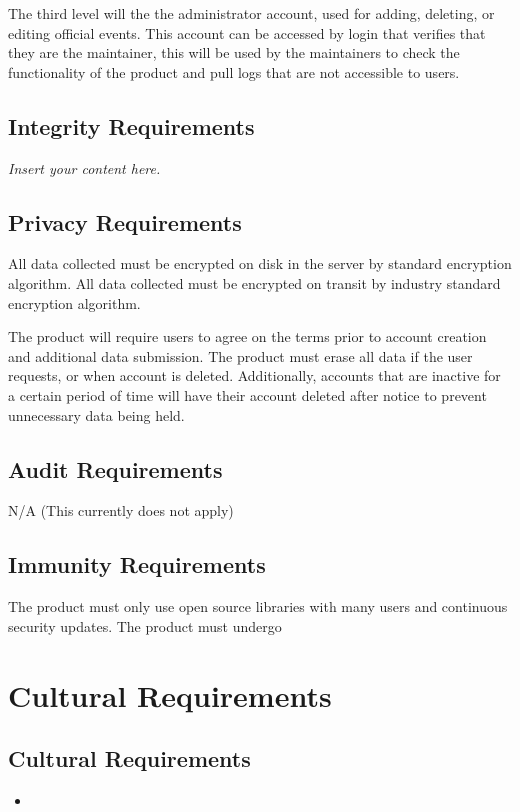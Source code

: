 \documentclass[12pt]{article}
\newcommand{\lips}{\textit{Insert your content here.}}
\begin{document}
The third level will the the administrator account, used for adding, deleting, or editing official events. This account can be accessed by login that verifies that they are the maintainer, this will be used by the maintainers to check the functionality of the product  and pull logs that are not accessible to users.

\subsection{Integrity Requirements}
\lips
\subsection{Privacy Requirements}

All data collected must be encrypted on disk in the server by standard encryption algorithm.
All data collected must be encrypted on transit by industry standard encryption algorithm.

The product will require users to agree on the terms prior to account creation and additional data submission.
The product must erase all data if the user requests, or when account is deleted.
Additionally, accounts that are inactive for a certain period of time will have their account deleted after notice to prevent unnecessary data being held.

\subsection{Audit Requirements}

N/A (This currently does not apply)

\subsection{Immunity Requirements}

The product must only use open source libraries with many users and continuous security updates. 
The product must undergo  

\section{Cultural Requirements}
\subsection{Cultural Requirements}
\begin{itemize}
  \item
\end{itemize}
\end{document}
